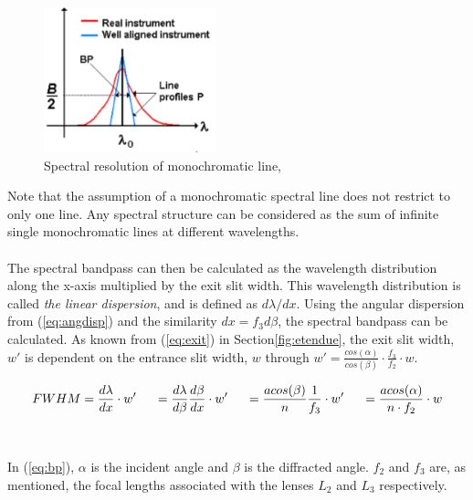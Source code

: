 \begin{figure}[H]
    \centering
    \includegraphics[width=5cm]{Images/theory/bp.png}
    \caption[Spectral Resolution]{Spectral resolution of monochromatic line, \cite{sigernes2018}}
    \label{fig:bp}
\end{figure}
\noindent
Note that the assumption of a monochromatic spectral line does not restrict to only one line. Any spectral structure can be considered as the sum of infinite single monochromatic lines at different wavelengths.
\\\\
The spectral bandpass can then be calculated as the wavelength distribution along the x-axis multiplied by the exit slit width. This wavelength distribution is called \textit{the linear dispersion}, and is defined as $d\lambda/dx$. Using the angular dispersion from (\ref{eq:angdisp}) and the similarity $dx = f_3 d\beta$, the spectral bandpass can be calculated. As known from (\ref{eq:exit}) in Section\ref{fig:etendue}, the exit slit width, $w'$ is dependent on the entrance slit width, $w$ through $w' = \frac{cos(\alpha)}{cos(\beta)}\cdot \frac{f_3}{f_2}\cdot w$.

\begin{equation}
    FWHM = \frac{d\lambda}{dx} \cdot w'\hspace{0.5cm}
    = \frac{d\lambda}{d\beta} \frac{d\beta}{dx}\cdot w' \hspace{0.5cm}
    = \frac{a cos(\beta)}{n} \frac{1}{f_3}\cdot w' \hspace{0.5cm}
    = \frac{a cos(\alpha)}{n\cdot f_2}\cdot w
    \label{eq:bp}
\end{equation}
\\\\
\noindent
In (\ref{eq:bp}), $\alpha$ is the incident angle and $\beta$ is the diffracted angle. $f_2$ and $f_3$ are, as mentioned, the focal lengths associated with the lenses $L_2$ and $L_3$ respectively.


